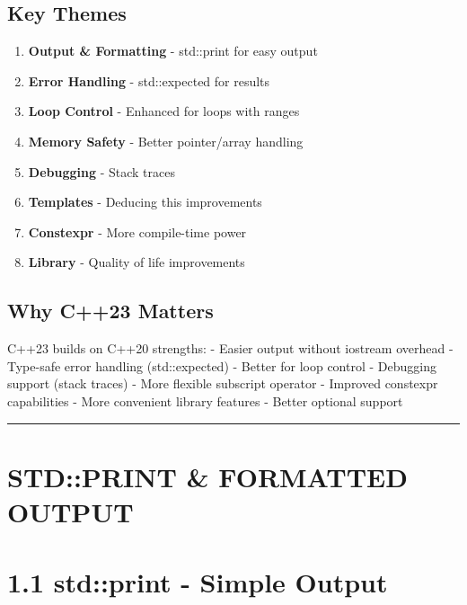\hypertarget{key-themes}{%
\subsection{Key Themes}\label{key-themes}}

\begin{enumerate}
\def\labelenumi{\arabic{enumi}.}
\tightlist
\item
  \textbf{Output \& Formatting} - std::print for easy output
\item
  \textbf{Error Handling} - std::expected for results
\item
  \textbf{Loop Control} - Enhanced for loops with ranges
\item
  \textbf{Memory Safety} - Better pointer/array handling
\item
  \textbf{Debugging} - Stack traces
\item
  \textbf{Templates} - Deducing this improvements
\item
  \textbf{Constexpr} - More compile-time power
\item
  \textbf{Library} - Quality of life improvements
\end{enumerate}

\hypertarget{why-c23-matters}{%
\subsection{Why C++23 Matters}\label{why-c23-matters}}

C++23 builds on C++20 strengths: - Easier output without iostream
overhead - Type-safe error handling (std::expected) - Better for loop
control - Debugging support (stack traces) - More flexible subscript
operator - Improved constexpr capabilities - More convenient library
features - Better optional support

\begin{center}\rule{0.5\linewidth}{0.5pt}\end{center}

\hypertarget{stdprint-formatted-output}{%
\section{STD::PRINT \& FORMATTED
OUTPUT}\label{stdprint-formatted-output}}

\hypertarget{stdprint---simple-output}{%
\section{1.1 std::print - Simple
Output}\label{stdprint---simple-output}}

